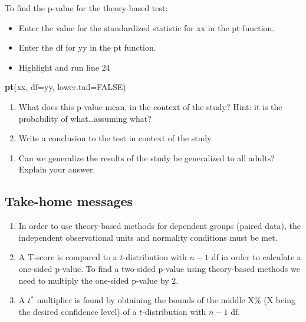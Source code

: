 \documentclass[
]{report}
\newenvironment{Shaded}{\begin{snugshade}}{\end{snugshade}}
\newcommand{\AttributeTok}[1]{\textcolor[rgb]{0.13,0.29,0.53}{#1}}
\newcommand{\ConstantTok}[1]{\textcolor[rgb]{0.56,0.35,0.01}{#1}}
\newcommand{\FunctionTok}[1]{\textcolor[rgb]{0.13,0.29,0.53}{\textbf{#1}}}
\newcommand{\NormalTok}[1]{#1}
\providecommand{\tightlist}{%
  \setlength{\itemsep}{0pt}\setlength{\parskip}{0pt}}
\begin{document}
To find the p-value for the theory-based test:

\begin{itemize}
\item
  Enter the value for the standardized statistic for xx in the pt function.
\item
  Enter the df for yy in the pt function.
\item
  Highlight and run line 24
\end{itemize}

\begin{Shaded}
\begin{Highlighting}[]
\FunctionTok{pt}\NormalTok{(xx, }\AttributeTok{df=}\NormalTok{yy, }\AttributeTok{lower.tail=}\ConstantTok{FALSE}\NormalTok{)}
\end{Highlighting}
\end{Shaded}

\begin{enumerate}
\def\labelenumi{\arabic{enumi}.}
\setcounter{enumi}{11}
\item
  What does this p-value mean, in the context of the study? Hint: it is the probability of what\ldots assuming what?
  \vspace{1in}
\item
  Write a conclusion to the test in context of the study.
\end{enumerate}

\vspace{0.6in}

\begin{enumerate}
\def\labelenumi{\arabic{enumi}.}
\setcounter{enumi}{13}
\tightlist
\item
  Can we generalize the results of the study be generalized to all adults? Explain your answer.
\end{enumerate}

\vspace{0.5in}

\subsection{Take-home messages}\label{take-home-messages-12}

\begin{enumerate}
\def\labelenumi{\arabic{enumi}.}
\item
  In order to use theory-based methods for dependent groups (paired data), the independent observational units and normality conditions must be met.
\item
  A T-score is compared to a \(t\)-distribution with \(n - 1\) df in order to calculate a one-sided p-value. To find a two-sided p-value using theory-based methods we need to multiply the one-sided p-value by 2.
\item
  A \(t^*\) multiplier is found by obtaining the bounds of the middle X\% (X being the desired confidence level) of a \(t\)-distribution with \(n - 1\) df.
\end{enumerate}
\end{document}
